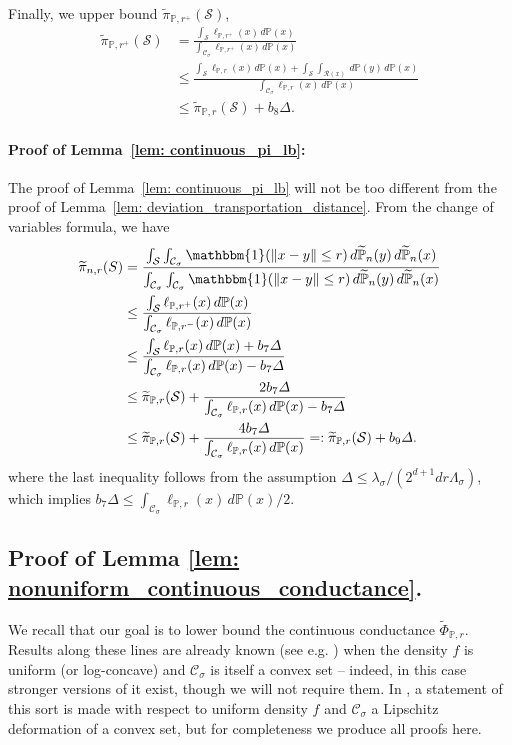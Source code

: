 \documentclass[11pt,twoside]{article}
\newcommand{\norm}[1]{\left\lVert#1\right\rVert}
\newcommand{\1}{\mathbbm{1}}
\newcommand{\Pbb}{\mathbb{P}}
\newcommand{\Sset}{\mathcal{S}}
\newcommand{\Cset}{\mathcal{C}}
\newcommand{\Csig}{\Cset_{\sigma}}
\begin{document}
Finally, we upper bound $\widetilde{\pi}_{\Pbb,r^{+}}(\Sset)$,
\begin{align*}
\widetilde{\pi}_{\Pbb,r^{+}}(\Sset) & = \frac{\int_{\Sset} \ell_{\Pbb,r^+}(x) \,d\Pbb(x)}{\int_{\Csig} \ell_{\Pbb,r^+}(x) \,d\Pbb(x)} \\
& \leq \frac{\int_{\Sset} \ell_{\Pbb,r}(x) \,d\Pbb(x) + \int_{\Sset} \int_{\mathcal{R}(x)} \,d\Pbb(y) \,d\Pbb(x)}{\int_{\Csig} \ell_{\Pbb,r}(x) \,d\Pbb(x)} \\
& \leq \widetilde{\pi}_{\Pbb,r}(\Sset) + b_8\varDelta.
\end{align*}

\paragraph{Proof of Lemma~\ref{lem: continuous_pi_lb}: }
The proof of Lemma~\ref{lem: continuous_pi_lb} will not be too different from the proof of Lemma~\ref{lem: deviation_transportation_distance}. From the change of variables formula, we have
\begin{align*}
\widetilde{\pi}_{n,r}(S) & = \frac{\int_{\Sset}\int_{\Csig} \1(\norm{x - y} \leq r) \,d\widetilde{\Pbb}_n(y) \,d\widetilde{\Pbb}_n(x)}{\int_{\Csig}\int_{\Csig} \1(\norm{x - y} \leq r) \,d\widetilde{\Pbb}_n(y) \,d\widetilde{\Pbb}_n(x)} \\
& \leq \frac{\int_{\Sset} \ell_{\Pbb,r^+}(x) \,d\Pbb(x) }{\int_{\Csig}\ell_{\Pbb,r^-}(x) \,d\Pbb(x)} \\
& \leq \frac{\int_{\Sset} \ell_{\Pbb,r}(x) \,d\Pbb(x) + b_7\varDelta}{\int_{\Csig} \ell_{\Pbb,r}(x) \,d\Pbb(x) - b_7\varDelta} \\
& \leq \widetilde{\pi}_{\Pbb,r}(\Sset) + \frac{2b_7\varDelta}{\int_{\Csig} \ell_{\Pbb,r}(x) \,d\Pbb(x) - b_7\varDelta} \\
& \leq \widetilde{\pi}_{\Pbb,r}(\Sset) + \frac{4b_7\varDelta}{\int_{\Csig} \ell_{\Pbb,r}(x) \,d\Pbb(x)} =: \widetilde{\pi}_{\Pbb,r}(\Sset) + b_9 \varDelta.
\end{align*}
where the last inequality follows from the assumption $\varDelta \leq \lambda_{\sigma}/(2^{d + 1} dr\Lambda_{\sigma})$, which implies $b_7\varDelta \leq \int_{\Csig}\ell_{\Pbb,r}(x) \,d\Pbb(x) / 2$.

\subsection{Proof of Lemma \ref{lem: nonuniform_continuous_conductance}. }
We recall that our goal is to lower bound the continuous conductance $\widetilde{\Phi}_{\Pbb,r}$. Results along these lines are already known (see e.g. \cite{kannan04}) when the density $f$ is uniform (or log-concave) and $\Csig$ is itself a convex set -- indeed, in this case stronger versions of it exist, though we will not require them. In \cite{abbasi-yadkori2016a}, a statement of this sort is made with respect to uniform density $f$ and $\Csig$ a Lipschitz deformation of a convex set, but for completeness we produce all proofs here.
\end{document}
